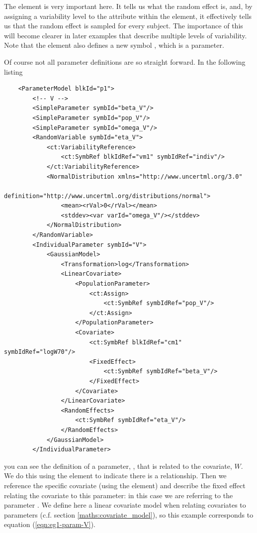 The  element is very important here. It tells us
what the random effect is, and, by assigning a variability level to
the attribute  within the  element,
it effectively tells us that the random effect is sampled for every subject.
The importance of this will become clearer in later examples that describe
multiple levels of variability. Note that the  element
also defines a new symbol , which is a parameter.


Of course not all parameter definitions are so straight forward. In the
following listing 
\lstset{language=XML}
\begin{lstlisting}
    <ParameterModel blkId="p1">
        <!-- V -->
        <SimpleParameter symbId="beta_V"/>
        <SimpleParameter symbId="pop_V"/>
        <SimpleParameter symbId="omega_V"/>
        <RandomVariable symbId="eta_V">
            <ct:VariabilityReference>
                <ct:SymbRef blkIdRef="vm1" symbIdRef="indiv"/>
            </ct:VariabilityReference>
            <NormalDistribution xmlns="http://www.uncertml.org/3.0" 
                definition="http://www.uncertml.org/distributions/normal">
                <mean><rVal>0</rVal></mean>
                <stddev><var varId="omega_V"/></stddev>
            </NormalDistribution>                            
        </RandomVariable>
        <IndividualParameter symbId="V">
            <GaussianModel>
                <Transformation>log</Transformation>
                <LinearCovariate>
                    <PopulationParameter>
                        <ct:Assign>
                            <ct:SymbRef symbIdRef="pop_V"/>
                        </ct:Assign>
                    </PopulationParameter>
                    <Covariate>
                        <ct:SymbRef blkIdRef="cm1" symbIdRef="logW70"/>
                        <FixedEffect>
                            <ct:SymbRef symbIdRef="beta_V"/>
                        </FixedEffect>
                    </Covariate>
                </LinearCovariate>
                <RandomEffects>
                    <ct:SymbRef symbIdRef="eta_V"/>
                </RandomEffects>
            </GaussianModel>
        </IndividualParameter>
\end{lstlisting}
you can see the definition of a
parameter, , that is related to the covariate, $W$. We do this
using the element  to indicate there is a
relationship. Then we reference the specific covariate (using the
 element) and describe the fixed effect relating the
covariate to this parameter: in this case we are referring to the
parameter . We define here a linear covariate model
when relating covariates to parameters (c.f.\xspace section
\ref{maths:covariate_model}), so this example corresponds to
equation (\ref{eqn:eg1-param-V}).

